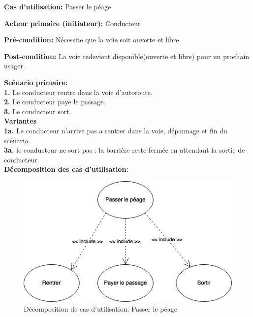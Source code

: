 \textbf{Cas d'utilisation:} Passer le péage
    
\textbf{Acteur primaire (initiateur):} Conducteur
    

\textbf{Pré-condition: } Nécessite que la voie soit ouverte et libre

    
\textbf{Post-condition: }   La voie redevient disponible(ouverte et libre) pour un prochain usager.
    
\textbf{Scénario primaire: } \\
\textbf{1.} Le conducteur rentre dans la voie d’autoroute.%
 \\
\textbf{2.} Le conducteur paye le passage. %
\\
\textbf{3.} Le conducteur sort. %
\\
    
\textbf{Variantes}\\
\textbf{1a.} Le conducteur n’arrive pas a rentrer dans la voie, dépannage et fin du scénario.\\
\textbf{3a.} le conducteur ne sort pas : la barrière reste fermée en attendant la sortie de conducteur.\\

\textbf{Décomposition des cas d'utilisation:} 
\begin{figure}[h]
    \centering
    \includegraphics[scale=0.7]{02_Desenvolvimento/TD2/images/PasserLePeage.png}
    \caption{Décomposition de cas d'utilisation: Passer le péage}
\end{figure}
